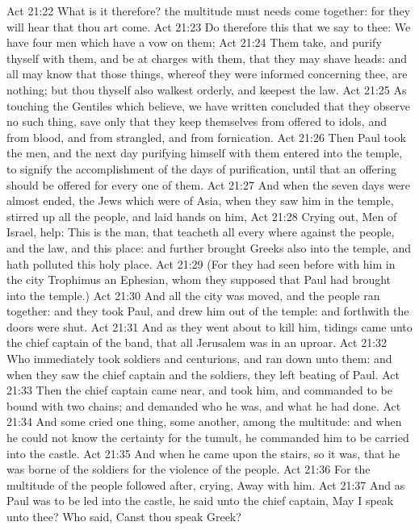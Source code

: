 \vs Act 21:22 What is it therefore? the multitude must needs come together: for they will hear that thou art come.
\vs Act 21:23 Do therefore this that we say to thee: We have four men which have a vow on them;
\vs Act 21:24 Them take, and purify thyself with them, and be at charges with them, that they may shave  heads: and all may know that those things, whereof they were informed concerning thee, are nothing; but  thou thyself also walkest orderly, and keepest the law.
\vs Act 21:25 As touching the Gentiles which believe, we have written  concluded that they observe no such thing, save only that they keep themselves from  offered to idols, and from blood, and from strangled, and from fornication.
\vs Act 21:26 Then Paul took the men, and the next day purifying himself with them entered into the temple, to signify the accomplishment of the days of purification, until that an offering should be offered for every one of them.
\vs Act 21:27 And when the seven days were almost ended, the Jews which were of Asia, when they saw him in the temple, stirred up all the people, and laid hands on him,
\vs Act 21:28 Crying out, Men of Israel, help: This is the man, that teacheth all  every where against the people, and the law, and this place: and further brought Greeks also into the temple, and hath polluted this holy place.
\vs Act 21:29 (For they had seen before with him in the city Trophimus an Ephesian, whom they supposed that Paul had brought into the temple.)
\vs Act 21:30 And all the city was moved, and the people ran together: and they took Paul, and drew him out of the temple: and forthwith the doors were shut.
\vs Act 21:31 And as they went about to kill him, tidings came unto the chief captain of the band, that all Jerusalem was in an uproar.
\vs Act 21:32 Who immediately took soldiers and centurions, and ran down unto them: and when they saw the chief captain and the soldiers, they left beating of Paul.
\vs Act 21:33 Then the chief captain came near, and took him, and commanded  to be bound with two chains; and demanded who he was, and what he had done.
\vs Act 21:34 And some cried one thing, some another, among the multitude: and when he could not know the certainty for the tumult, he commanded him to be carried into the castle.
\vs Act 21:35 And when he came upon the stairs, so it was, that he was borne of the soldiers for the violence of the people.
\vs Act 21:36 For the multitude of the people followed after, crying, Away with him.
\vs Act 21:37 And as Paul was to be led into the castle, he said unto the chief captain, May I speak unto thee? Who said, Canst thou speak Greek?
